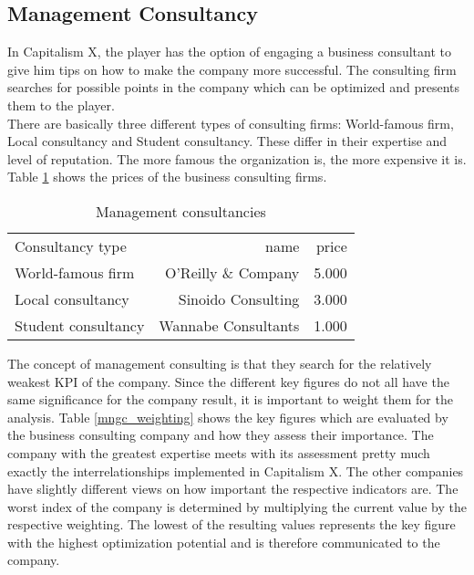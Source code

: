 \subsection{Management Consultancy} \label{management_consultancy_simulation}
In Capitalism X, the player has the option of engaging a business consultant to give him tips on how to make the company more successful. 
The consulting firm searches for possible points in the company which can be optimized and presents them to the player.\\ 

There are basically three different types of consulting firms: World-famous firm, Local consultancy and Student consultancy. These differ in their expertise and level of reputation. The more famous the organization is, the more expensive it is. Table \ref{mng_consultancy} shows the prices of the business consulting firms. \\

\begin{table}[ht]
\centering
\begin{tabular}{|l|r|r|}
\hline
Consultancy type        & name  & price \\
World-famous firm       & O'Reilly \& Company     & 5.000     \\
Local consultancy       & Sinoido Consulting     & 3.000     \\
Student consultancy     & Wannabe Consultants    & 1.000     \\
\hline
\end{tabular}
\caption{Management consultancies}
\label{mng_consultancy}
\end{table}

The concept of management consulting is that they search for the relatively weakest KPI of the company. Since the different key figures do not all have the same significance for the company result, it is important to weight them for the analysis.
Table \ref{mngc_weighting} shows the key figures which are evaluated by the business consulting company and how they assess their importance.
The company with the greatest expertise meets with its assessment pretty much exactly the interrelationships implemented in Capitalism X. The other companies have slightly different views on how important the respective indicators are. 
The worst index of the company is determined by multiplying the current value by the respective weighting. The lowest of the resulting values represents the key figure with the highest optimization potential and is therefore communicated to the company. 
 
